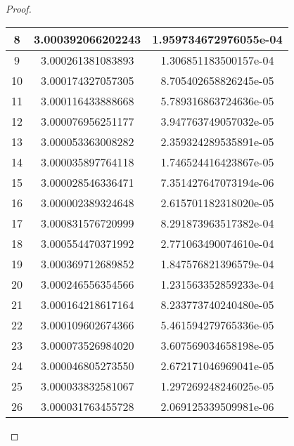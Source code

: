 \begin{enumerate}
\begin{proof}
\begin{table}[htbp]
\begin{subtable}[t]{.49\linewidth}
\begin{tabular}{|c|c|c|}
			\footnotesize	8	&	\footnotesize	3.000392066202243	&	\footnotesize	1.959734672976055e-04	\\	\hline
			\footnotesize	9	&	\footnotesize	3.000261381083893	&	\footnotesize	1.306851183500157e-04	\\	\hline
			\footnotesize	10	&	\footnotesize	3.000174327057305	&	\footnotesize	8.705402658826245e-05	\\	\hline
			\footnotesize	11	&	\footnotesize	3.000116433888668	&	\footnotesize	5.789316863724636e-05	\\	\hline
			\footnotesize	12	&	\footnotesize	3.000076956251177	&	\footnotesize	3.947763749057032e-05	\\	\hline
			\footnotesize	13	&	\footnotesize	3.000053363008282	&	\footnotesize	2.359324289535891e-05	\\	\hline
			\footnotesize	14	&	\footnotesize	3.000035897764118	&	\footnotesize	1.746524416423867e-05	\\	\hline
			\footnotesize	15	&	\footnotesize	3.000028546336471	&	\footnotesize	7.351427647073194e-06	\\	\hline
			\footnotesize	16	&	\footnotesize	3.000002389324648	&	\footnotesize	2.615701182318020e-05	\\	\hline
			\footnotesize	17	&	\footnotesize	3.000831576720999	&	\footnotesize	8.291873963517382e-04	\\	\hline
			\footnotesize	18	&	\footnotesize	3.000554470371992	&	\footnotesize	2.771063490074610e-04	\\	\hline
			\footnotesize	19	&	\footnotesize	3.000369712689852	&	\footnotesize	1.847576821396579e-04	\\	\hline
			\footnotesize	20	&	\footnotesize	3.000246556354566	&	\footnotesize	1.231563352859233e-04	\\	\hline
			\footnotesize	21	&	\footnotesize	3.000164218617164	&	\footnotesize	8.233773740240480e-05	\\	\hline
			\footnotesize	22	&	\footnotesize	3.000109602674366	&	\footnotesize	5.461594279765336e-05	\\	\hline
			\footnotesize	23	&	\footnotesize	3.000073526984020	&	\footnotesize	3.607569034658198e-05	\\	\hline
			\footnotesize	24	&	\footnotesize	3.000046805273550	&	\footnotesize	2.672171046969041e-05	\\	\hline
			\footnotesize	25	&	\footnotesize	3.000033832581067	&	\footnotesize	1.297269248246025e-05	\\	\hline
			\footnotesize	26	&	\footnotesize	3.000031763455728	&	\footnotesize	2.069125339509981e-06	\\	\hline

\end{tabular}
\end{subtable}
\end{table}
\end{proof}
\end{enumerate}
